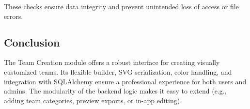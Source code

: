 \documentclass[12pt]{article}
\begin{document}
\noindent These checks ensure data integrity and prevent unintended loss of access or file errors.

\subsection{Conclusion}

The Team Creation module offers a robust interface for creating visually customized teams. Its flexible builder, SVG serialization, color handling, and integration with SQLAlchemy ensure a professional experience for both users and admins. The modularity of the backend logic makes it easy to extend (e.g., adding team categories, preview exports, or in-app editing).
\end{document}
